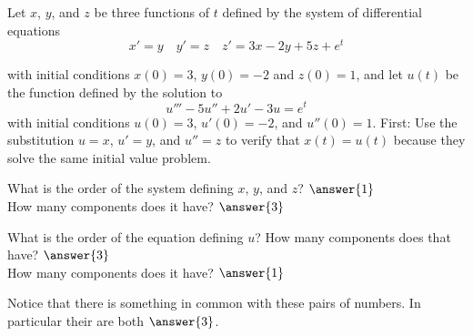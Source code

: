 \documentclass{ximera}
\begin{document}
\begin{exercise}%
    Let $x$, $y$, and $z$ be three functions of $t$ defined by the system of differential equations
    \begin{equation*} 
        x' = y \quad y' = z \quad z' = 3x - 2y + 5z + e^t
    \end{equation*}
    
    with initial conditions $x(0) = 3$, $y(0) = -2$ and $z(0) = 1$, and let $u(t)$ be the function defined by the solution to
    \begin{equation*}
        u''' - 5u'' + 2u' - 3u = e^t
    \end{equation*}
    with initial conditions $u(0) = 3$, $u'(0) = -2$, and $u''(0) = 1$. 
    First: Use the substitution $u=x$, $u' = y$, and $u'' = z$ to verify that $x(t) = u(t)$ because they solve the same initial value problem.

    \begin{problem}
        What is the order of the system defining $x$, $y$, and $z$? $\answer{1}$\\
        How many components does it have? $\answer{3}$


        What is the order of the equation defining $u$? How many components does that have? $\answer{3}$\\
        How many components does it have? $\answer{1}$
        
        \begin{problem}
            Notice that there is something in common with these pairs of numbers. In particular their
             are both $\answer{3}$.
        \end{problem}

    \end{problem}

\end{exercise}
%
\end{document}
